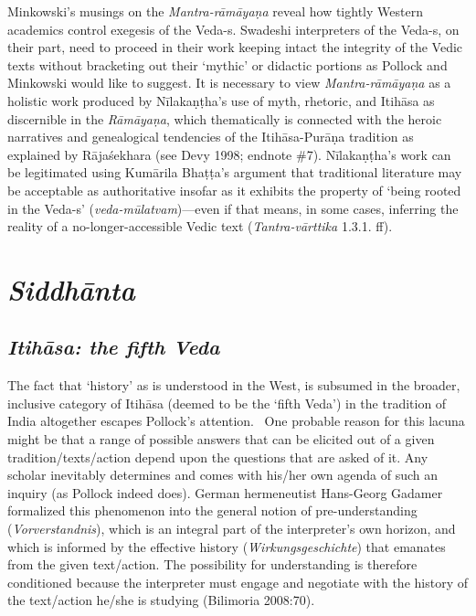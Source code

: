 Minkowski’s musings on the \textit{Mantra-rāmāyaṇa} reveal how tightly Western academics control exegesis of the Veda-s. Swadeshi interpreters of the Veda-s, on their part, need to proceed in their work keeping intact the integrity of the Vedic texts without bracketing out their ‘mythic’ or didactic portions as Pollock and Minkowski would like to suggest. It is necessary to view \textit{Mantra-rāmāyaṇa} as a holistic work produced by Nīlakaṇṭha’s use of myth, rhetoric, and Itihāsa as discernible in the \textit{Rāmāyaṇa}, which thematically is connected with the heroic narratives and genealogical tendencies of the Itihāsa-Purāṇa tradition as explained by Rājaśekhara (see Devy 1998; endnote \#7). Nīlakaṇṭha’s work can be legitimated using Kumārila Bhaṭṭa’s argument that traditional literature may be acceptable as authoritative insofar as it exhibits the property of ‘being rooted in the Veda-s’ (\textit{veda-mūlatvam})—even if that means, in some cases, inferring the reality of a no-longer-accessible Vedic text (\textit{Tantra-vārttika} 1.3.1. ff).


\section*{\textit{Siddhānta}}

\subsection*{\textit{Itihāsa: the fifth Veda}}

The fact that ‘history’ as is understood in the West, is subsumed in the broader, inclusive category of Itihāsa (deemed to be the ‘fifth Veda’) in the tradition of India altogether escapes Pollock’s attention.  One probable reason for this lacuna might be that a range of possible answers that can be elicited out of a given tradition/texts/action depend upon the questions that are asked of it. Any scholar inevitably determines and comes with his/her own agenda of such an inquiry (as Pollock indeed does). German hermeneutist Hans-Georg Gadamer formalized this phenomenon into the general notion of pre-understanding (\textit{Vorverstandnis}), which is an integral part of the interpreter’s own horizon, and which is informed by the effective history (\textit{Wirkungsgeschichte}) that emanates from the given text/action. The possibility for understanding is therefore conditioned because the interpreter must engage and negotiate with the history of the text/action he/she is studying (Bilimoria 2008:70). 

